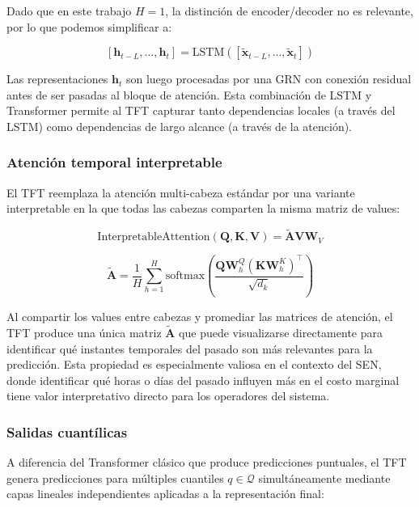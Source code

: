 Dado que en este trabajo $H = 1$, la distinción de encoder/decoder no es relevante, por lo que podemos simplificar a:

\begin{equation}
\left[\mathbf{h}_{t-L}, \ldots, \mathbf{h}_t\right] = \text{LSTM}\left(\left[\tilde{\mathbf{x}}_{t-L}, \ldots, \tilde{\mathbf{x}}_t\right]\right)
\end{equation}

Las representaciones $\mathbf{h}_t$ son luego procesadas por una GRN con conexión residual antes de ser pasadas al bloque de atención. Esta combinación de LSTM y Transformer permite al TFT capturar tanto dependencias locales (a través del LSTM) como dependencias de largo alcance (a través de la atención).

\subsubsection{Atención temporal interpretable}

El TFT reemplaza la atención multi-cabeza estándar por una variante interpretable en la que todas las cabezas comparten la misma matriz de values:

\begin{equation}
\text{InterpretableAttention}(\mathbf{Q}, \mathbf{K}, \mathbf{V}) = \tilde{\mathbf{A}}\mathbf{V}\mathbf{W}_V
\end{equation}

\begin{equation}
\tilde{\mathbf{A}} = \frac{1}{H}\sum_{h=1}^{H} \text{softmax}\left(\frac{\mathbf{Q}\mathbf{W}_h^Q (\mathbf{K}\mathbf{W}_h^K)^\top}{\sqrt{d_k}}\right)
\end{equation}

Al compartir los values entre cabezas y promediar las matrices de atención, el TFT produce una única matriz $\tilde{\mathbf{A}}$ que puede visualizarse directamente para identificar qué instantes temporales del pasado son más relevantes para la predicción. Esta propiedad es especialmente valiosa en el contexto del SEN, donde identificar qué horas o días del pasado influyen más en el costo marginal tiene valor interpretativo directo para los operadores del sistema.

\subsubsection{Salidas cuantílicas}

A diferencia del Transformer clásico que produce predicciones puntuales, el TFT genera predicciones para múltiples cuantiles $q \in \mathcal{Q}$ simultáneamente mediante capas lineales independientes aplicadas a la representación final:


